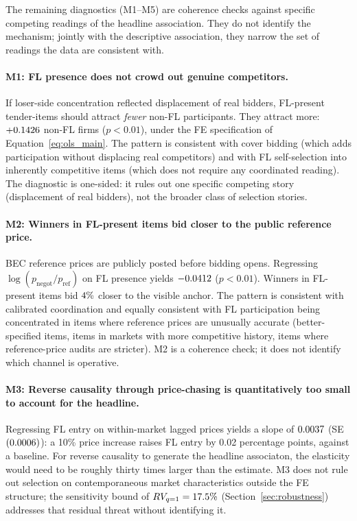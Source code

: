 The remaining diagnostics (M1--M5) are coherence checks
against specific competing readings of the headline
association. They do not identify the mechanism; jointly with
the descriptive association, they narrow the set of readings
the data are consistent with.

\paragraph{M1: FL presence does not crowd out genuine
competitors.} If loser-side concentration reflected
displacement of real bidders, FL-present tender-items should
attract \emph{fewer} non-FL participants. They attract more:
$+0.1426$ non-FL firms ($p < 0.01$), under the FE specification
of Equation~\eqref{eq:ols_main}. The pattern is consistent
with cover bidding (which adds participation without
displacing real competitors) and with FL self-selection into
inherently competitive items (which does not require any
coordinated reading). The diagnostic is one-sided: it rules
out one specific competing story (displacement of real
bidders), not the broader class of selection stories.

\paragraph{M2: Winners in FL-present items bid closer to the
public reference price.} BEC reference prices are publicly
posted before bidding opens. Regressing
$\log(p_{\text{negot}} / p_{\text{ref}})$ on FL presence
yields $-0.0412$ ($p < 0.01$). Winners in FL-present items bid
$4\%$ closer to the visible anchor. The pattern is
consistent with calibrated coordination
\citep{marshall2012economics} and equally consistent with FL
participation being concentrated in items where reference
prices are unusually accurate (better-specified items, items
in markets with more competitive history, items where
reference-price audits are stricter). M2 is a coherence check;
it does not identify which channel is operative.

\paragraph{M3: Reverse causality through price-chasing is
quantitatively too small to account for the headline.}
Regressing FL entry on within-market lagged prices yields a
slope of $0.0037$ (SE $(0.0006)$): a 10\% price increase raises
FL entry by 0.02 percentage points, against a \valCartelMarkup baseline.
For reverse causality to generate the headline associaton, the
elasticity would need to be roughly thirty times larger than
the estimate. M3 does not rule out selection on contemporaneous
market characteristics outside the FE structure; the
\citet{cinelli2020making} sensitivity bound of $RV_{q=1} =
17.5\%$ (Section~\ref{sec:robustness}) addresses that residual
threat without identifying it.

